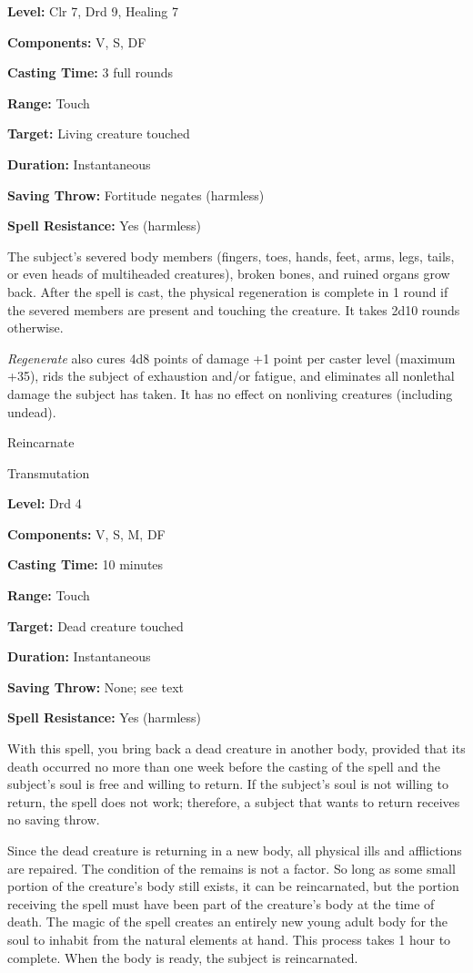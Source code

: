 \documentclass{article}
\begin{document}
\textbf{Level:} Clr 7, Drd 9, Healing 7

\textbf{Components:} V, S, DF

\textbf{Casting Time:} 3 full rounds

\textbf{Range:} Touch

\textbf{Target:} Living creature touched

\textbf{Duration:} Instantaneous

\textbf{Saving Throw:} Fortitude negates (harmless)

\textbf{Spell Resistance:} Yes (harmless)

The subject's severed body members (fingers, toes, hands, feet, arms, legs, tails, 
or even heads of multiheaded creatures), broken bones, and ruined organs grow back. 
After the spell is cast, the physical regeneration is complete in 1 round if the 
severed members are present and touching the creature. It takes 2d10 rounds otherwise.

\textit{Regenerate }also cures 4d8 points of damage +1 point per caster level (maximum 
+35), rids the subject of exhaustion and/or fatigue, and eliminates all nonlethal 
damage the subject has taken. It has no effect on nonliving creatures (including 
undead).

\vspace{12pt}
Reincarnate

Transmutation

\textbf{Level:} Drd 4

\textbf{Components:} V, S, M, DF

\textbf{Casting Time:} 10 minutes

\textbf{Range:} Touch

\textbf{Target:} Dead creature touched

\textbf{Duration:} Instantaneous

\textbf{Saving Throw:} None; see text

\textbf{Spell Resistance:} Yes (harmless)

With this spell, you bring back a dead creature in another body, provided that 
its death occurred no more than one week before the casting of the spell and the 
subject's soul is free and willing to return. If the subject's soul is not willing 
to return, the spell does not work; therefore, a subject that wants to return receives 
no saving throw.

Since the dead creature is returning in a new body, all physical ills and afflictions 
are repaired. The condition of the remains is not a factor. So long as some small 
portion of the creature's body still exists, it can be reincarnated, but the portion 
receiving the spell must have been part of the creature's body at the time of death. 
The magic of the spell creates an entirely new young adult body for the soul to 
inhabit from the natural elements at hand. This process takes 1 hour to complete. 
 When the body is ready, the subject is reincarnated.
\end{document}
